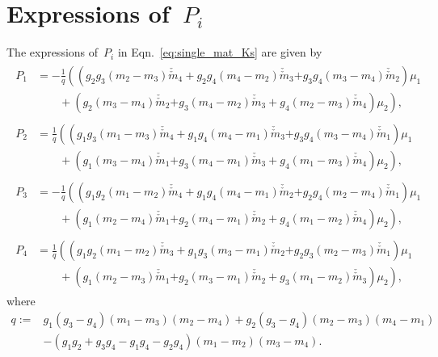 \documentclass[preprint,12pt,times]{elsarticle}
\newcommand{\minus}[1]{\check{#1}}
\newcommand{\minusminus}[1]{\minus{\minus{#1}}}
\numberwithin{equation}{section}
\renewcommand{\>}{$\Rightarrow$}
\begin{document}
\section{Expressions of~$P_i$}
\label{Appen:Pi}
The expressions of~$P_i$ in Eqn.~\eqref{eq:single_mat_Ks} are given by
\begin{subequations}
\begin{align}
	\begin{split}
	P_1 & = -\frac{1}{q} \left(\left(g_2 g_3 (m_2 - m_3)\minusminus{m}_{4} + g_2 g_4 (m_4 - m_2)\minusminus{m}_{3} \right.\right.\left. + g_3 g_4 (m_3 - m_4)\minusminus{m}_{2} \right) \mu_1  \\
    &\qquad{} 
    + \left(g_2 (m_3 - m_4)\minusminus{m}_{2} \right. \left.\left. + g_3(m_4 - m_2)\minusminus{m}_{3} + g_4 (m_2 - m_3)\minusminus{m}_{4} \right)\mu_2 \right) ,
	\end{split} \\
	\begin{split}
	P_2 & = \frac{1}{q} \left(\left( g_1 g_3 (m_1 - m_3)\minusminus{m}_{4} + g_1 g_4 (m_4 - m_1)\minusminus{m}_{3}\right.\right. \left. + g_3 g_4 (m_3 - m_4)\minusminus{m}_{1}  \right) \mu_1 \\
    &\qquad{} 
     + \left(g_1 (m_3 - m_4)\minusminus{m}_{1} \right.\left.\left. + g_3(m_4 - m_1)\minusminus{m}_{3} + g_4 (m_1 - m_3)\minusminus{m}_{4}  \right)\mu_2  \right),
	\end{split} \\
	\begin{split}
	P_3 & = -\frac{1}{q} \left(\left(g_1 g_2 (m_1 - m_2)\minusminus{m}_{4} + g_1 g_4 (m_4 - m_1)\minusminus{m}_{2}\right.\right. \left. + g_2 g_4 (m_2 - m_4)\minusminus{m}_{1} \right) \mu_1 \\
    &\qquad{} 
    + \left( g_1 (m_2 - m_4)\minusminus{m}_{1} \right.\left.\left. + g_2(m_4 - m_1)\minusminus{m}_{2} + g_4 (m_1 - m_2)\minusminus{m}_{4}\right)\mu_2\right),
	\end{split} \\
	\begin{split}
	P_4 & = \frac{1}{q} \left(\left( g_1 g_2 (m_1 - m_2)\minusminus{m}_{3} + g_1 g_3 (m_3 - m_1)\minusminus{m}_{2} \right.\right. \left. + g_2 g_3 (m_2 - m_3)\minusminus{m}_{1} \right) \mu_1 \\
    &\qquad{} 
    +  \left(g_1 (m_2 - m_3)\minusminus{m}_{1} \right.\left.\left. + g_2(m_3 - m_1)\minusminus{m}_{2} + g_3 (m_1 - m_2)\minusminus{m}_{3}\right)\mu_2\right),
	\end{split}
	\end{align}
\end{subequations}
where
\begin{equation}
	\begin{aligned}
	q := & g_1(g_3 - g_4)(m_1 - m_3)(m_2 - m_4) 
	 	+ g_2(g_3 - g_4)(m_2 - m_3)(m_4 - m_1) \\
	 	& - (g_1 g_2 + g_3 g_4 - g_1 g_4 - g_2 g_4)(m_1 - m_2)(m_3 - m_4).
	\end{aligned}
\end{equation}
\end{document}
